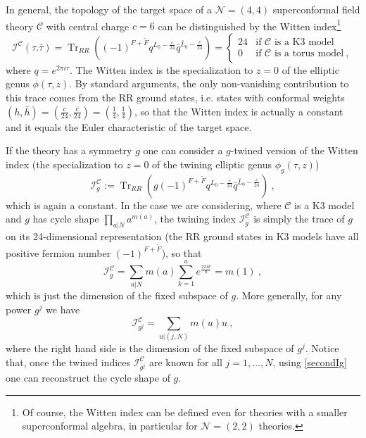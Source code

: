 \documentclass[a4paper,11pt]{article}
\newcommand{\C}{\mathcal{C}}
\newcommand{\I}{\mathcal{I}}
\newcommand{\N}{\mathcal{N}}
\DeclareMathOperator{\Tr}{Tr}
\numberwithin{equation}{section}
\def\be{\begin{equation}}
\def\ee{\end{equation}}
\begin{document}
In general, the topology of the target space of a $\N=(4,4)$ superconformal field theory $\C$ with central charge $c=6$ can be distinguished by the Witten index\footnote{Of course, the Witten index can be defined even for theories with a smaller superconformal algebra, in particular for $\N=(2,2)$ theories.}
\be \I^\C(\tau.\bar\tau)=\Tr_{RR}((-1)^{F+\tilde F}q^{L_0-\frac{c}{24}}\bar q^{\bar L_0-\frac{c}{24}})=\begin{cases}24 & \text{if $\C$ is a K3 model}\\ 0 & \text{if $\C$ is a torus model}\ ,\end{cases}
\ee where $q=e^{2\pi i\tau}$. The Witten index is the specialization to $z=0$ of the elliptic genus $\phi(\tau,z)$. By standard arguments, the only non-vanishing contribution to this trace comes from the RR ground states, i.e. states with conformal weights $(h,\bar h)=(\frac{c}{24},\frac{\bar c}{24})=(\frac{1}{4},\frac{1}{4})$, so that the Witten index is actually a constant and it equals the Euler characteristic of the target space. 


If the theory has a symmetry $g$ one can consider a $g$-twined version of the Witten index (the specialization to $z=0$ of the twining elliptic genus $\phi_g(\tau,z)$)
\be \I^\C_g:=\Tr_{RR}(g(-1)^{F+\tilde F}q^{L_0-\frac{c}{24}}\bar q^{\bar L_0-\frac{c}{24}})\ ,
\ee which is again a constant. In the case we are considering, where $\C$ is a K3 model and $g$ has cycle shape $\prod_{a|N} a^{m(a)}$, the twining index $\I^\C_g$ is simply the trace of $g$ on its $24$-dimensional representation (the RR ground states in K3 models have all positive fermion number $(-1)^{F+\tilde F}$), so that
\be\label{firstIg} \I^\C_{g}=\sum_{a|N} m(a) \sum_{k=1}^a e^{\frac{2\pi i k}{a}}=m(1)\ ,\ee which is just the dimension of the fixed subspace of $g$. More generally, for any power $g^j$ we have
\be\label{secondIg} \I^\C_{g^j}=
\sum_{u|(j,N)} m(u)u\ ,
\ee where the right hand side is the dimension of the fixed subspace of $g^j$. 
Notice that, once the twined indices $\I^\C_{g^j}$ are known for all $j=1,\ldots,N$, using \eqref{secondIg} one can reconstruct the cycle shape of $g$.
\end{document}
